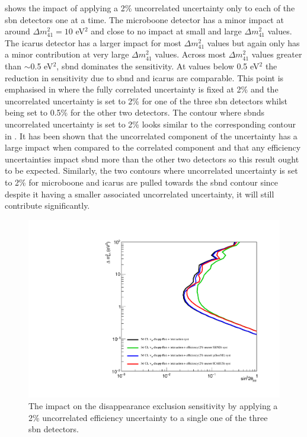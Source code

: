  shows the impact of applying a 2\% uncorrelated uncertainty only to each of the \gls{sbn} detectors one at a time. The \gls{microboone} detector has a minor impact at around $\Delta m ^2_{41} = 10$ eV$^2$ and close to no impact at small and large $\Delta m ^2_{41}$ values. The \gls{icarus} detector has a larger impact for most $\Delta m ^2_{41}$ values but again only has a minor contribution at very large $\Delta m ^2_{41}$ values. Across most $\Delta m ^2_{41}$ values greater than $\sim$0.5 eV$^2$, \gls{sbnd} dominates the sensitivity. At values below 0.5 eV$^2$ the reduction in sensitivity due to \gls{sbnd} and \gls{icarus} are comparable. This point is emphasised in  where the fully correlated uncertainty is fixed at 2\% and the uncorrelated uncertainty is set to 2\% for one of the three \gls{sbn} detectors whilst being set to 0.5\% for the other two detectors. The contour where \glspl{sbnd} uncorrelated uncertainty is set to 2\% looks similar to the corresponding contour in . It has been shown that the uncorrelated component of the uncertainty has a large impact when compared to the correlated component and that any efficiency uncertainties impact \gls{sbnd} more than the other two detectors so this result ought to be expected. Similarly, the two contours where uncorrelated uncertainty is set to 2\% for \gls{microboone} and \gls{icarus} are pulled towards the \gls{sbnd} contour since despite it having a smaller associated uncorrelated uncertainty, it will still contribute significantly. 

\begin{figure}[!h]
    \centering
    \includegraphics[width = \largefigwidth]{figures-chap6/exclusion_contours/efficiency_systematics/numu_disapp_2pct_uncor_per_detector.pdf}
    \caption[Impact of a 2\% uncorrelated efficiency systematic on the \numu disappearance channel for each individual detector.]{The impact on the \numu disappearance exclusion sensitivity by applying a 2\% uncorrelated efficiency uncertainty to a single one of the three \gls{sbn} detectors.}
    \label{fig:numu_uncorr_det}
\end{figure}

